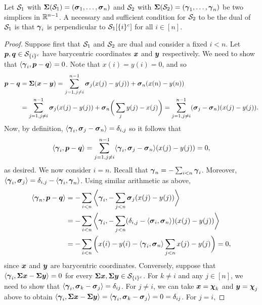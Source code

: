 \begin{lemma}
	Let $\mathcal{S}_1$ with $\boldsymbol{\Sigma}(\mathcal{S}_1)=(\vb*{\sigma}_1,\dots,\vb*{\sigma}_n)$ and $\mathcal{S}_2$ with $\boldsymbol{\Sigma}(\mathcal{S}_2)=(\vb*{\gamma}_1,\dots,\vb*{\gamma}_n)$ be two simplices in $\mathbb{R}^{n-1}$. A necessary and sufficient condition for $\mathcal{S}_2$ to be the dual of $\mathcal{S}_1$ is that $\vb*{\gamma}_i$ is perpendicular to $\mathcal{S}_1[{\{i\}^c}]$ for all $i\in[n]$. 
\end{lemma}
\begin{proof}
Suppose first that $\mathcal{S}_1$ and $\mathcal{S}_2$ are dual 
and consider a fixed $i<n$. Let $\vb*{p},\vb*{q}\in\mathcal{S}_{\{i\}^c}$ have barycentric coordinates $\vb*{x}$ and $\vb*{y}$ respectively. We need to show that $\langle \vb*{\gamma}_i,\vb*{p}-\vb*{q}\rangle =0$. Note that $x(i)=y(i)=0$, and so 
\begin{align*}
    \vb*{p}-\vb*{q} &= \boldsymbol{\Sigma}(\vb*{x}-\vb*{y}) = \sum_{j=1,j\neq i}^{n-1} \vb*{\sigma}_j(x(j)-y(j)) + \vb*{\sigma}_n(x(n)-y(n)) \\
    &= \sum_{j=1,j\neq i}^{n-1} \vb*{\sigma}_j(x(j)-y(j)) + \vb*{\sigma}_n\bigg(\sum_{j}y(j)-x(j)\bigg) = \sum_{j=1,j\neq i}^{n-1} (\vb*{\sigma}_j-\vb*{\sigma}_n)(x(j)-y(j)). 
\end{align*}
Now, by definition, $\langle \vb*{\gamma}_i,\vb*{\sigma}_j-\vb*{\sigma}_n\rangle = \delta_{i,j}$ so it follows that \[\langle \vb*{\gamma}_i,\vb*{p}-\vb*{q}\rangle = \sum_{j=1,j\neq i}^{n-1}\langle \vb*{\gamma}_i,\vb*{\sigma}_j-\vb*{\sigma}_n\rangle (x(j)-y(j))=0,\]
as desired. We now consider $i=n$. Recall that $\vb*{\gamma}_n=-\sum_{i<n}\vb*{\gamma}_i$. Moreover, $\langle \vb*{\gamma}_i,\vb*{\sigma}_j\rangle = \delta_{i,j}-\langle \vb*{\gamma}_i,\vb*{\gamma}_n\rangle$. Using similar arithmetic as above, 
\begin{align*}
    \langle \vb*{\gamma}_n ,\vb*{p}-\vb*{q}\rangle &= -\sum_{i<n}\bigg\langle \vb*{\gamma}_i,-\sum_{j<n} \vb*{\sigma}_j(x(j)-y(j))\bigg\rangle \\
    &= -\sum_{i<n}\bigg\langle \vb*{\gamma}_i,-\sum_{j<n} (\delta_{i,j}-\langle \vb*{\sigma}_i,\vb*{\sigma}_n\rangle)(x(j)-y(j))\bigg\rangle \\
    &= -\sum_{i<n}\bigg(x(i)-y(i)-\langle\vb*{\gamma}_i,\vb*{\sigma}_n\rangle  \sum_{j<n} x(j)-y(j)\bigg) =0,
\end{align*}
since $\vb*{x}$ and $\vb*{y}$ are barycentric coordinates. Conversely, suppose that $\langle \vb*{\gamma}_i, \boldsymbol{\Sigma}\vb*{x}-\boldsymbol{\Sigma}\vb*{y}\rangle=0$ for every $\boldsymbol{\Sigma}\vb*{x},\boldsymbol{\Sigma}\vb*{y}\in\mathcal{S}_{\{i\}^c}$. For $k\neq i$ and any $j\in[n]$, we need to show that $\langle \vb*{\gamma}_i,\vb*{\sigma}_k-\vb*{\sigma}_j\rangle = \delta_{ij}$. For $j\neq i$, we can take $\vb*{x}=\boldsymbol{\chi}_k$ and $\vb*{y}=\boldsymbol{\chi}_j$ above to obtain $\langle \vb*{\gamma}_i,\boldsymbol{\Sigma}\vb*{x}-\boldsymbol{\Sigma}\vb*{y}\rangle = \langle \vb*{\gamma}_i,\vb*{\sigma}_k-\vb*{\sigma}_j\rangle = 0=\delta_{ij}$. For $j=i$, 
\end{proof}

